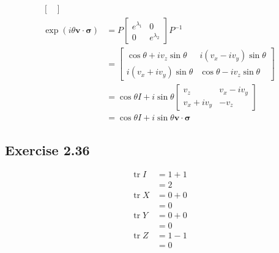 \documentclass{article}
\newcommand{\tr}{\operatorname{tr}}
\renewcommand{\vec}[1]{\boldsymbol{\mathbf{#1}}}
\begin{document}
\begin{align*}
\begin{bmatrix}
                                                 \end{bmatrix}                                             \\
  \exp (i \theta \vec{v} \cdot \vec{\sigma}) & = P \begin{bmatrix}
                                                     e^{\lambda_1} & 0             \\
                                                     0             & e^{\lambda_2}
                                                   \end{bmatrix} P^{-1}                                   \\
                                             & = \begin{bmatrix}
                                                   \cos \theta + i v_z \sin \theta & i (v_x - i v_y) \sin \theta     \\
                                                   i (v_x + i v_y) \sin \theta     & \cos \theta - i v_z \sin \theta
                                                 \end{bmatrix} \\
                                             & = \cos \theta I + i \sin \theta \begin{bmatrix}
                                                                                 v_z         & v_x - i v_y \\
                                                                                 v_x + i v_y & -v_z
                                                                               \end{bmatrix}           \\
                                             & = \cos \theta I + i \sin \theta \vec{v} \cdot \vec{\sigma}
\end{align*}

\subsection*{Exercise 2.36}

\begin{align*}
  \tr I & = 1 + 1 \\
        & = 2     \\
  \tr X & = 0 + 0 \\
        & = 0     \\
  \tr Y & = 0 + 0 \\
        & = 0     \\
  \tr Z & = 1 - 1 \\
        & = 0
\end{align*}
\end{document}
